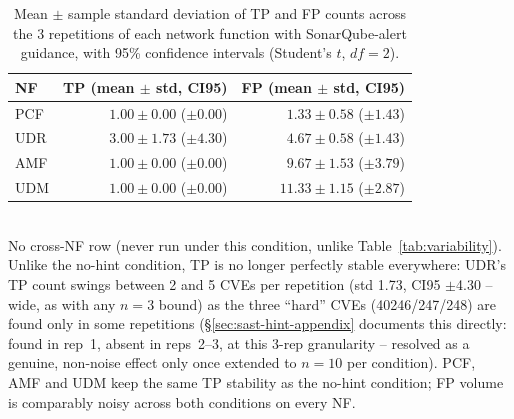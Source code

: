 \begin{table}[t]
\centering
\caption{Mean $\pm$ sample standard deviation of TP and FP counts across the 3 repetitions of each network function with SonarQube-alert guidance, with 95\% confidence intervals (Student's $t$, $df=2$).}
\label{tab:variability-hint}
\begin{tabular}{lrr}
\toprule
NF & TP (mean $\pm$ std, CI95) & FP (mean $\pm$ std, CI95) \\
\midrule
PCF & $1.00 \pm 0.00$ ($\pm 0.00$) & $1.33 \pm 0.58$ ($\pm 1.43$) \\
UDR & $3.00 \pm 1.73$ ($\pm 4.30$) & $4.67 \pm 0.58$ ($\pm 1.43$) \\
AMF & $1.00 \pm 0.00$ ($\pm 0.00$) & $9.67 \pm 1.53$ ($\pm 3.79$) \\
UDM & $1.00 \pm 0.00$ ($\pm 0.00$) & $11.33 \pm 1.15$ ($\pm 2.87$) \\
\bottomrule
\end{tabular}
\\[2pt]
\footnotesize{No cross-NF row (never run under this condition, unlike Table~\ref{tab:variability}). Unlike the no-hint condition, TP is no longer perfectly stable everywhere: UDR's TP count swings between 2 and 5 CVEs per repetition (std 1.73, CI95 $\pm$4.30 -- wide, as with any $n=3$ bound) as the three ``hard'' CVEs (40246/247/248) are found only in some repetitions (\S\ref{sec:sast-hint-appendix} documents this directly: found in rep~1, absent in reps~2--3, at this 3-rep granularity -- resolved as a genuine, non-noise effect only once extended to $n=10$ per condition). PCF, AMF and UDM keep the same TP stability as the no-hint condition; FP volume is comparably noisy across both conditions on every NF.}
\end{table}

